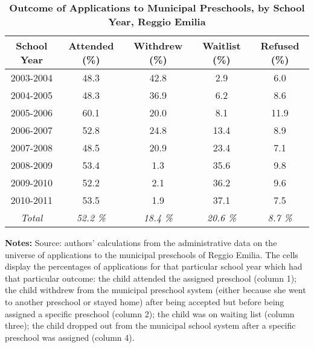 \documentclass{article}
\begin{document}
\begin{table}[ht!]
\caption{\textbf{Outcome of Applications to Municipal Preschools, by School Year, Reggio Emilia}}
\label{tab:OutcApps}
\vspace{-5mm}
\begin{center}
\begin{tabular}{c c c c c }
\hline\hline
\textbf{School Year} & \textbf{Attended (\%)} & \textbf{Withdrew (\%)} & \textbf{Waitlist (\%)} & \textbf{Refused (\%)} \\
\hline
        2003-2004  &   48.3  &    42.8  &    2.9  &    6.0   \\[0.2em]
        2004-2005  &   48.3  &    36.9  &    6.2  &    8.6   \\[0.2em]
        2005-2006  &   60.1  &    20.0  &    8.1  &   11.9   \\[0.2em]
        2006-2007  &   52.8  &    24.8  &   13.4  &    8.9   \\[0.2em]
        2007-2008  &   48.5  &    20.9  &   23.4  &    7.1   \\[0.2em]
        2008-2009  &   53.4  &     1.3  &   35.6  &    9.8   \\[0.2em]
        2009-2010  &   52.2  &     2.1  &   36.2  &    9.6   \\[0.2em]
        2010-2011  &   53.5  &     1.9  &   37.1  &    7.5   \\[0.2em]
\hline
\textit{Total} &   \textit{52.2 \%} &   \textit{18.4 \%} &   \textit{20.6 \%} &    \textit{8.7 \%}  \\[0.2em]
\hline
\end{tabular}
\end{center}
\footnotesize{{\bfseries Notes:} Source: authors' calculations from the administrative data on the universe of applications to the municipal preschools of Reggio Emilia. The cells display the percentages of applications for that particular school year which had that particular outcome: the child attended the assigned preschool (column 1); the child withdrew from the municipal preschool system (either because she went to another preschool or stayed home) after being accepted but before being assigned a specific preschool (column 2); the child was on waiting list (column three); the child dropped out from the municipal school system after a specific preschool was assigned (column 4).}
\end{table}
\end{document}
